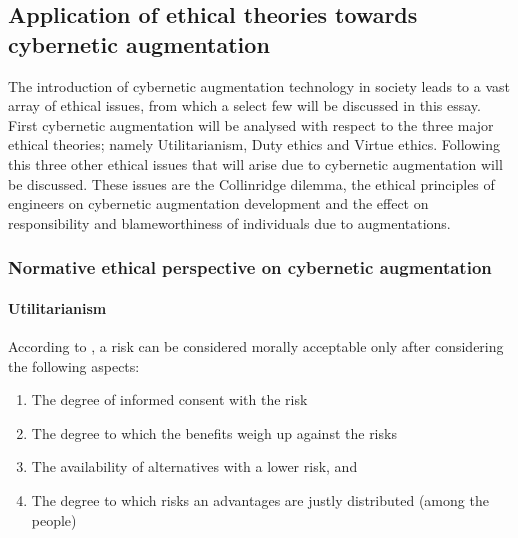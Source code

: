 \subsection{Application of ethical theories towards cybernetic augmentation}


The introduction of cybernetic augmentation technology in society leads to a vast array of ethical issues, from which a select few will be discussed in this essay. First cybernetic augmentation will be analysed with respect to the three major ethical theories; namely Utilitarianism, Duty ethics and Virtue ethics. Following this three other ethical issues that will arise due to cybernetic augmentation will be discussed. These issues are the Collinridge dilemma, the ethical principles of engineers on cybernetic augmentation development and the effect on responsibility and blameworthiness of individuals due to augmentations.

\subsubsection{Normative ethical perspective on cybernetic augmentation}

\paragraph{Utilitarianism}

According to \cite{Ethics_textbook}, a risk can be considered morally acceptable only after considering the following aspects:
\begin{enumerate}
	\item The degree of informed consent with the risk
	\item The degree to which the benefits weigh up against the risks
	\item The availability of alternatives with a lower risk, and
	\item The degree to which risks an advantages are justly distributed (among the people)
\end{enumerate}


